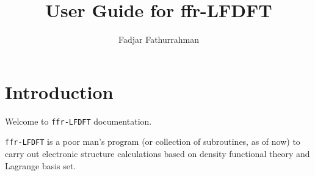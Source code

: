 \documentclass[a4paper,11pt,fleqn]{extarticle}
\begin{document}
\title{User Guide for {\ttfamily ffr-LFDFT}}
\author{Fadjar Fathurrahman}
\date{}
\maketitle

\tableofcontents

\section{Introduction}

Welcome to {\tt ffr-LFDFT} documentation.

{\tt ffr-LFDFT} is a poor man's program (or collection of subroutines, as of now)
to carry out electronic structure calculations based on density functional theory
and Lagrange basis set.




\end{document}

